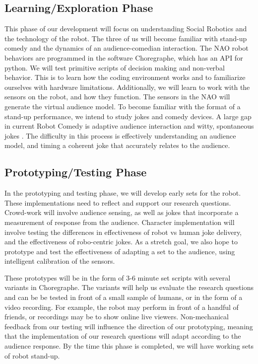 \documentclass[onecolumn, draftclsnofoot,10pt, compsoc]{IEEEtran}
\begin{document}
\subsection{Learning/Exploration Phase}
This phase of our development will focus on understanding Social Robotics and the technology of the robot. The three of us will become familiar with stand-up comedy and the dynamics of an audience-comedian interaction. The NAO robot behaviors are programmed in the software Choregraphe, which has an API for python. We will test primitive scripts of decision making and non-verbal behavior. This is to learn how the coding environment works and to familiarize ourselves with hardware limitations. Additionally, we will learn to work with the sensors on the robot, and how they function. The sensors in the NAO will generate the virtual audience model. To become familiar with the format of a stand-up performance, we intend to study jokes and comedy devices. A large gap in current Robot Comedy is adaptive audience interaction and witty, spontaneous jokes \cite{KatevasRobot:2014}. The difficulty in this process is effectively understanding an audience model, and timing a coherent joke that accurately relates to the audience.

\subsection{Prototyping/Testing Phase}
In the prototyping and testing phase, we will develop early sets for the robot. These implementations need to reflect and support our research questions. Crowd-work will involve audience sensing, as well as jokes that incorporate a measurement of response from the audience. Character implementation will involve testing the differences in effectiveness of robot vs human joke delivery, and the effectiveness of robo-centric jokes. As a stretch goal, we also hope to prototype and test the effectiveness of adapting a set to the audience, using intelligent calibration of the sensors.

These prototypes will be in the form of 3-6 minute set scripts with several variants in Choregraphe. The variants will help us evaluate the research questions and can be be tested in front of a small sample of humans, or in the form of a video recording. For example, the robot may perform in front of a handful of friends, or recordings may be to show online live viewers. Non-mechanical feedback from our testing will influence the direction of our prototyping, meaning that the implementation of our research questions will adapt according to the audience response. By the time this phase is completed, we will have working sets of robot stand-up.
\end{document}
